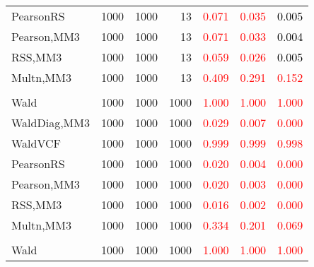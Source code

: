 \documentclass[
]{article}
\begin{document}
\begin{table}[H]
{\begin{tabular}[t]{lrrrrrr}
\hspace{1em}PearsonRS & 1000 & 1000 & 13 & \textcolor{red}{0.071} & \textcolor{red}{0.035} & \textcolor{black}{0.005}\\
\hspace{1em}Pearson,MM3 & 1000 & 1000 & 13 & \textcolor{red}{0.071} & \textcolor{red}{0.033} & \textcolor{black}{0.004}\\
\hspace{1em}RSS,MM3 & 1000 & 1000 & 13 & \textcolor{red}{0.059} & \textcolor{red}{0.026} & \textcolor{black}{0.005}\\
\hspace{1em}Multn,MM3 & 1000 & 1000 & 13 & \textcolor{red}{0.409} & \textcolor{red}{0.291} & \textcolor{red}{0.152}\\
\addlinespace[0.3em]
\multicolumn{7}{l}{\textbf{1F 15V}}\\
\hspace{1em}Wald & 1000 & 1000 & 1000 & \textcolor{red}{1.000} & \textcolor{red}{1.000} & \vphantom{2} \textcolor{red}{1.000}\\
\hspace{1em}WaldDiag,MM3 & 1000 & 1000 & 1000 & \textcolor{red}{0.029} & \textcolor{red}{0.007} & \textcolor{red}{0.000}\\
\hspace{1em}WaldVCF & 1000 & 1000 & 1000 & \textcolor{red}{0.999} & \textcolor{red}{0.999} & \textcolor{red}{0.998}\\
\hspace{1em}PearsonRS & 1000 & 1000 & 1000 & \textcolor{red}{0.020} & \textcolor{red}{0.004} & \textcolor{red}{0.000}\\
\hspace{1em}Pearson,MM3 & 1000 & 1000 & 1000 & \textcolor{red}{0.020} & \textcolor{red}{0.003} & \textcolor{red}{0.000}\\
\hspace{1em}RSS,MM3 & 1000 & 1000 & 1000 & \textcolor{red}{0.016} & \textcolor{red}{0.002} & \textcolor{red}{0.000}\\
\hspace{1em}Multn,MM3 & 1000 & 1000 & 1000 & \textcolor{red}{0.334} & \textcolor{red}{0.201} & \textcolor{red}{0.069}\\
\addlinespace[0.3em]
\multicolumn{7}{l}{\textbf{2F 10V}}\\
\hspace{1em}Wald & 1000 & 1000 & 1000 & \textcolor{red}{1.000} & \textcolor{red}{1.000} & \vphantom{1} \textcolor{red}{1.000}\\

\end{tabular}}
\end{table}
\end{document}
